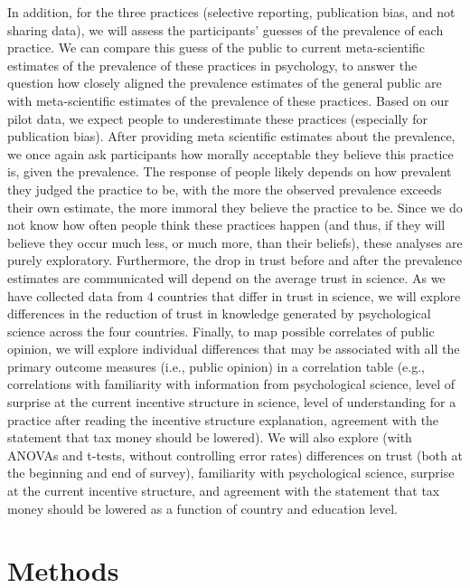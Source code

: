 \documentclass[
  man,floatsintext]{apa7}
\begin{document}
In addition, for the three practices (selective reporting, publication bias, and not sharing data), we will
assess the participants' guesses of the prevalence of each practice. We can compare this
guess of the public to current meta-scientific estimates of the prevalence of these practices
in psychology, to answer the question how closely aligned the prevalence estimates of the
general public are with meta-scientific estimates of the prevalence of these practices.
Based on our pilot data, we expect people to underestimate these practices (especially for
publication bias). After providing meta scientific estimates about the prevalence, we once
again ask participants how morally acceptable they believe this practice is, given the
prevalence. The response of people likely depends on how prevalent they judged the
practice to be, with the more the observed prevalence exceeds their own estimate, the
more immoral they believe the practice to be. Since we do not know how often people
think these practices happen (and thus, if they will believe they occur much less, or much
more, than their beliefs), these analyses are purely exploratory.
Furthermore, the drop in trust before and after the prevalence estimates are communicated will depend
on the average trust in science. As we have collected data from 4 countries that differ in
trust in science, we will explore differences in the reduction of trust in knowledge
generated by psychological science across the four countries.
Finally, to map possible correlates of public opinion, we will explore individual differences that
may be associated with all the primary outcome measures (i.e., public opinion) in a
correlation table (e.g., correlations with familiarity with information from psychological
science, level of surprise at the current incentive structure in science, level of
understanding for a practice after reading the incentive structure explanation, agreement
with the statement that tax money should be lowered). We will also explore (with ANOVAs
and t-tests, without controlling error rates) differences on trust (both at the beginning and
end of survey), familiarity with psychological science, surprise at the current incentive
structure, and agreement with the statement that tax money should be lowered as a
function of country and education level.

\hypertarget{methods}{%
\section{Methods}\label{methods}}
\end{document}
